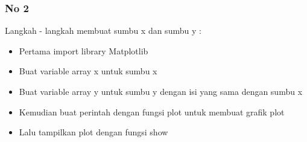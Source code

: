 \subsubsection{No 2}

Langkah - langkah membuat sumbu x dan sumbu y :
\begin{itemize}
\item Pertama import library Matplotlib \\

\item Buat variable array x untuk sumbu x \\

\item Buat variable array y untuk sumbu y dengan isi yang sama dengan sumbu x \\

\item Kemudian buat perintah dengan fungsi plot untuk membuat grafik plot \\

\item Lalu tampilkan plot dengan fungsi show \\

\end{itemize}

